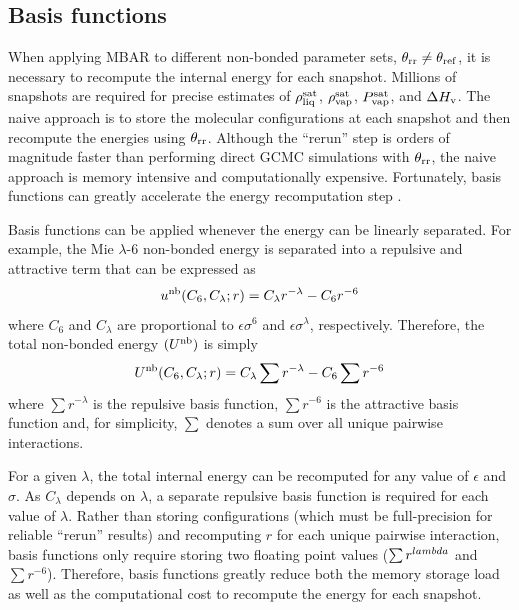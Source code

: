 \documentclass[journal=jced,manuscript=article]{achemso}
\begin{document}
\subsection{Basis functions} \label{sec: Basis functions}

When applying MBAR to different non-bonded parameter sets, $\theta_{\rm rr} \neq \theta_{\rm ref}$, it is necessary to recompute the internal energy for each snapshot. Millions of snapshots are required for precise estimates of $\rho_{\rm liq}^{\rm sat}$, $\rho_{\rm vap}^{\rm sat}$, $P_{\rm vap}^{\rm sat}$, and $\Delta H_{\rm v}$. The naive approach is to store the molecular configurations at each snapshot and then recompute the energies using $\theta_{\rm rr}$. Although the ``rerun'' step is orders of magnitude faster than performing direct GCMC simulations with $\theta_{\rm rr}$, the naive approach is memory intensive and computationally expensive. Fortunately, basis functions can greatly accelerate the energy recomputation step  \cite{naden:jctc:2016,Postdoc_1}. 

Basis functions can be applied whenever the energy can be linearly separated. For example, the Mie $\lambda$-6 non-bonded energy is separated into a repulsive and attractive term that can be expressed as
\begin{equation} \label{Mie basis function}
u^{\rm nb}(C_6,C_\lambda;r) = C_\lambda r^{-\lambda} - C_6 r^{-6}
\end{equation} 
where $C_6$ and $C_\lambda$ are proportional to $\epsilon \sigma^6$ and $\epsilon \sigma^\lambda$, respectively. Therefore, the total non-bonded energy $(U^{\rm nb})$ is simply
\begin{equation} \label{Utotal basis function}
U^{\rm nb}(C_6,C_\lambda;r) = C_\lambda \sum r^{-\lambda} - C_6 \sum r^{-6}
\end{equation}
where $\sum r^{-\lambda}$ is the repulsive basis function, $\sum r^{-6}$ is the attractive basis function and, for simplicity, $\sum$ denotes a sum over all unique pairwise interactions.

For a given $\lambda$, the total internal energy can be recomputed for any value of $\epsilon$ and $\sigma$. As $C_\lambda$ depends on $\lambda$, a separate repulsive basis function is required for each value of $\lambda$. Rather than storing configurations (which must be full-precision for reliable ``rerun'' results) and recomputing $r$ for each unique pairwise interaction, basis functions only require storing two floating point values ($\sum r^{\-lambda}$ and $\sum r^{-6}$). Therefore, basis functions greatly reduce both the memory storage load as well as the computational cost to recompute the energy for each snapshot. 
\end{document}
